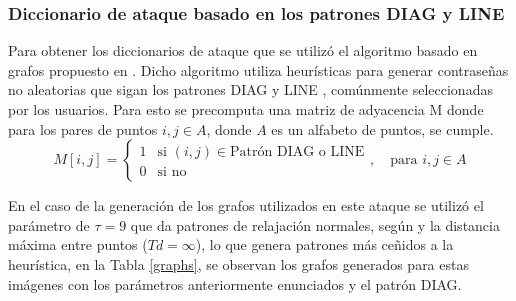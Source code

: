 \subsubsection{Diccionario de ataque basado en los patrones DIAG y LINE}
Para obtener los diccionarios de ataque que se utiliz\'o el algoritmo basado en grafos propuesto en \cite{van2010purely}. Dicho algoritmo utiliza heur\'isticas para generar contrase\~nas no aleatorias que sigan los patrones DIAG y LINE \cite{s22051987},  com\'unmente seleccionadas por los usuarios. Para esto se precomputa una matriz de adyacencia M donde para los pares de puntos $i,j \in A$, donde $A$ es un alfabeto de puntos, se cumple.
\[
 M[i,j] = 
\begin{cases} 
	1 & \text{si } (i, j) \in \text{Patrón DIAG o LINE} \\
	0 & \text{si no}
\end{cases}
, \quad \text{para } i,j \in A
\] 

En el caso de la generaci\'on de los grafos utilizados en este ataque se utiliz\'o el par\'ametro de $\tau=9$ que da patrones de relajaci\'on normales, seg\'un \cite{van2010purely} y la distancia m\'axima entre puntos ($Td = \infty$), lo que genera patrones m\'as ce\~nidos a la heur\'istica, en la Tabla \ref{graphs},  se observan los grafos generados para estas im\'agenes con los par\'ametros anteriormente enunciados y el patr\'on DIAG.



